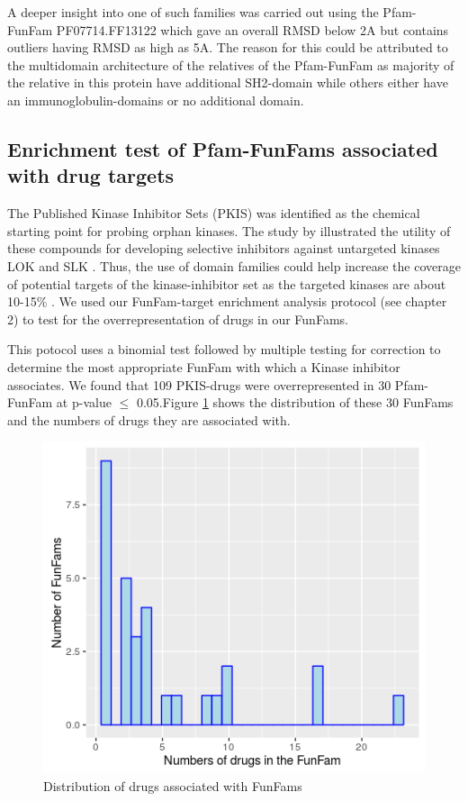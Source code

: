 \documentclass[a4paper, 11pt]{article}
\begin{document}
A deeper insight into one of such families was carried out using the Pfam-FunFam PF07714.FF13122 which gave an overall RMSD below 2A but contains outliers having RMSD as high as 5A. The reason for this could be attributed to the multidomain architecture of the relatives of the Pfam-FunFam as majority of the relative in this protein have additional SH2-domain  while others either have an immunoglobulin-domains or no additional domain.

\subsection*{Enrichment test of Pfam-FunFams associated with drug targets}
The Published Kinase Inhibitor Sets (PKIS) was identified as the chemical starting point for probing orphan kinases. The study by \cite{anastassiadis2011comprehensive} illustrated the utility of these compounds for developing selective inhibitors against untargeted kinases LOK and SLK . Thus, the use of domain families could help increase the coverage of potential targets of the kinase-inhibitor set as the targeted kinases are about 10-15\% . We used our FunFam-target enrichment analysis protocol (see chapter 2) to test for the overrepresentation of drugs in our FunFams. \par This potocol uses a binomial test followed by multiple testing for correction to determine the most appropriate FunFam with which a Kinase inhibitor associates. We found that 109 PKIS-drugs were overrepresented in 30 Pfam-FunFam at p-value $\leq$ 0.05.Figure \ref{distdrugFF} shows the distribution of these 30 FunFams and the numbers of drugs they are associated with.
\begin{figure}[H]
	\includegraphics[width=.8\linewidth]{figures/ffdrugdis.png}
	\centering
	\caption{Distribution of drugs associated with FunFams}
	\label{distdrugFF}
\end{figure}
\end{document}
